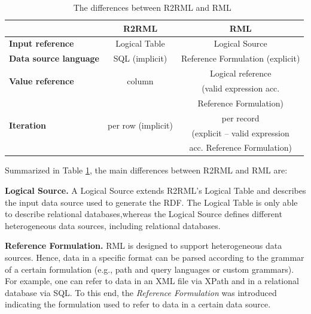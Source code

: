 \begin{table}[!t]
\centering
\caption{The differences between R2RML and RML~\citep{dimou2020high}}
\label{tab:soa_rmlvsr2rml}
\begin{tabular}{l|c|c}
                                          & \textbf{R2RML}                      & \textbf{RML}                         \\
\hline                                          
\textbf{Input reference}                  & Logical Table                       & Logical Source                       \\
\hline
\textbf{Data source language}             & SQL (implicit)                      & Reference Formulation (explicit)     \\
\hline
\multirow{2}{*}{\textbf{Value reference}} & \multirow{2}{*}{column}             & Logical reference \\
                                          &                                     & (valid expression acc. \\
                                          &                                     & Reference Formulation) \\
\hline                                          
\multirow{2}{*}{\textbf{Iteration}}       & \multirow{2}{*}{per row (implicit)} & per record        \\
                                          &                                     & (explicit -- valid expression        \\
                                          &                                     & acc. Reference Formulation)
\end{tabular}
\end{table}


\noindent Summarized in Table \ref{tab:soa_rmlvsr2rml}, the main differences between R2RML and RML are:

\noindent\textbf{{Logical Source.}} A Logical Source extends R2RML's Logical Table and describes the input data source used to generate the RDF. The Logical Table is only able to describe relational databases,whereas the Logical Source defines different heterogeneous data sources, including relational databases.

\noindent\textbf{{Reference Formulation.}} RML is designed to support heterogeneous data sources. Hence, data in a specific format can be parsed according to the grammar of a certain formulation (e.g., path and query languages or custom grammars). For example, one can refer to data in an XML file via XPath and in a relational database via SQL. To this end, the \emph{Reference Formulation} was introduced indicating the formulation used to refer to data in a certain data source.

